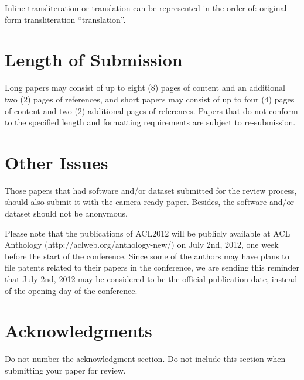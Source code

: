 \documentclass[11pt]{article}
\begin{document}
Inline transliteration or translation can be represented in
the order of: original-form transliteration ``translation''.

\section{Length of Submission}
\label{sec:length}

Long papers may consist of up to eight (8) pages of content and an
additional two (2) pages of references, and short papers may consist
of up to four (4) pages of content and two (2) additional pages of
references.  Papers that do not conform to the specified length and
formatting requirements are subject to re-submission.

\section{Other Issues}
 
Those papers that had software and/or dataset submitted for the review process, should also submit it 
with the camera-ready paper. Besides, the software and/or dataset should not be anonymous. 

Please note that the publications of ACL2012 will be publicly available at ACL Anthology 
(http://aclweb.org/anthology-new/) on July 2nd, 2012, one week before the start of the conference. 
Since some of the authors may have plans to file patents related to their papers in the conference, 
we are sending this reminder that July 2nd, 2012 may be considered to be the official publication date, 
instead of the opening day of the conference.

\section*{Acknowledgments}

Do not number the acknowledgment section. Do not include this section when submitting your paper for review.
\end{document}
